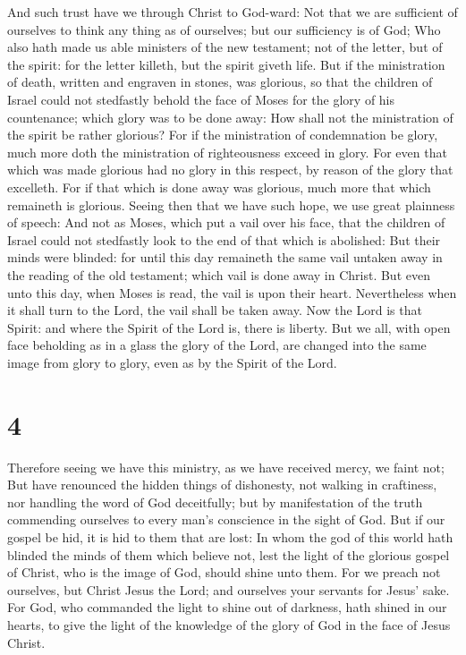  And such trust have we through Christ to God-ward:
 Not that we are sufficient of ourselves to think any
thing as of ourselves; but our sufficiency is of God;  Who
also hath made us able ministers of the new testament; not of the
letter, but of the spirit: for the letter killeth, but the spirit giveth
life.  But if the ministration of death, written and
engraven in stones, was glorious, so that the children of Israel could
not stedfastly behold the face of Moses for the glory of his
countenance; which glory was to be done away:  How shall
not the ministration of the spirit be rather glorious? 
For if the ministration of condemnation be glory, much more doth the
ministration of righteousness exceed in glory.  For even
that which was made glorious had no glory in this respect, by reason of
the glory that excelleth.  For if that which is done away
was glorious, much more that which remaineth is glorious.
 Seeing then that we have such hope, we use great
plainness of speech:  And not as Moses, which put a vail
over his face, that the children of Israel could not stedfastly look to
the end of that which is abolished:  But their minds were
blinded: for until this day remaineth the same vail untaken away in the
reading of the old testament; which vail is done away in Christ.
 But even unto this day, when Moses is read, the vail is
upon their heart.  Nevertheless when it shall turn to the
Lord, the vail shall be taken away.  Now the Lord is that
Spirit: and where the Spirit of the Lord is, there is liberty.
 But we all, with open face beholding as in a glass the
glory of the Lord, are changed into the same image from glory to glory,
even as by the Spirit of the Lord.

\hypertarget{section-3}{%
\section{4}\label{section-3}}

 Therefore seeing we have this ministry, as we have
received mercy, we faint not;  But have renounced the
hidden things of dishonesty, not walking in craftiness, nor handling the
word of God deceitfully; but by manifestation of the truth commending
ourselves to every man's conscience in the sight of God. 
But if our gospel be hid, it is hid to them that are lost:
 In whom the god of this world hath blinded the minds of
them which believe not, lest the light of the glorious gospel of Christ,
who is the image of God, should shine unto them.  For we
preach not ourselves, but Christ Jesus the Lord; and ourselves your
servants for Jesus' sake.  For God, who commanded the
light to shine out of darkness, hath shined in our hearts, to give the
light of the knowledge of the glory of God in the face of Jesus Christ.

